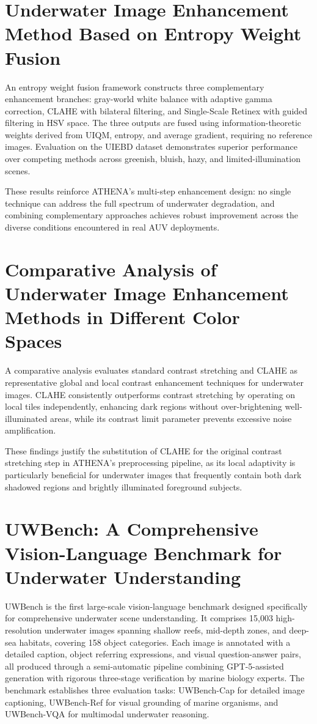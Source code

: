 \section[Du, Sun, K. Wang, Yang \& C. Wang]{Underwater Image Enhancement Method Based on Entropy Weight Fusion~\cite{3step1}}
An entropy weight fusion framework constructs three complementary enhancement branches: gray-world white balance with adaptive gamma correction, CLAHE with bilateral filtering, and Single-Scale Retinex with guided filtering in HSV space. The three outputs are fused using information-theoretic weights derived from UIQM, entropy, and average gradient, requiring no reference images. Evaluation on the UIEBD dataset demonstrates superior performance over competing methods across greenish, bluish, hazy, and limited-illumination scenes.

These results reinforce ATHENA's multi-step enhancement design: no single technique can address the full spectrum of underwater degradation, and combining complementary approaches achieves robust improvement across the diverse conditions encountered in real AUV deployments.

\section[Wong, Yu, Ho \& Paramesran]{Comparative Analysis of Underwater Image Enhancement Methods in Different Color Spaces~\cite{clahe}}
A comparative analysis evaluates standard contrast stretching and CLAHE as representative global and local contrast enhancement techniques for underwater images. CLAHE consistently outperforms contrast stretching by operating on local tiles independently, enhancing dark regions without over-brightening well-illuminated areas, while its contrast limit parameter prevents excessive noise amplification.

These findings justify the substitution of CLAHE for the original contrast stretching step in ATHENA's preprocessing pipeline, as its local adaptivity is particularly beneficial for underwater images that frequently contain both dark shadowed regions and brightly illuminated foreground subjects.

\section[Zhang, Rong, Li, Wang, Zhao, Gao \& X. Li]{UWBench: A Comprehensive Vision-Language Benchmark for Underwater Understanding~\cite{uwbench}}
UWBench is the first large-scale vision-language benchmark designed specifically for comprehensive underwater scene understanding. It comprises 15,003 high-resolution underwater images spanning shallow reefs, mid-depth zones, and deep-sea habitats, covering 158 object categories. Each image is annotated with a detailed caption, object referring expressions, and visual question-answer pairs, all produced through a semi-automatic pipeline combining GPT-5-assisted generation with rigorous three-stage verification by marine biology experts. The benchmark establishes three evaluation tasks: UWBench-Cap for detailed image captioning, UWBench-Ref for visual grounding of marine organisms, and UWBench-VQA for multimodal underwater reasoning.

